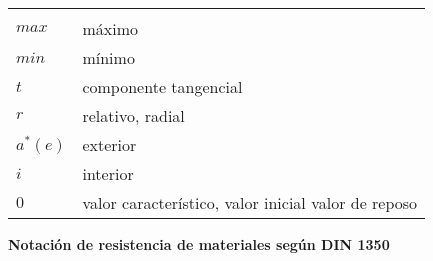 \begin{mytable}[H]
	\centering
	\begin{tabular}{ll}
		\multicolumn{1}{c}{\quad\quad\quad} & \multicolumn{1}{c}{} \\
		$max$  \quad\quad\quad& máximo \\	
		$min$  & mínimo \\
		$t$ &  componente tangencial \\
		$r$ & relativo, radial \\
		$a^* (e)$ & exterior \\
		$i$ & interior \\
		$0$ & valor característico, valor inicial valor de reposo \\
	\end{tabular}
\end{mytable}



\begin{center}
	\textbf{Notación de resistencia de materiales según DIN 1350}
\end{center}

